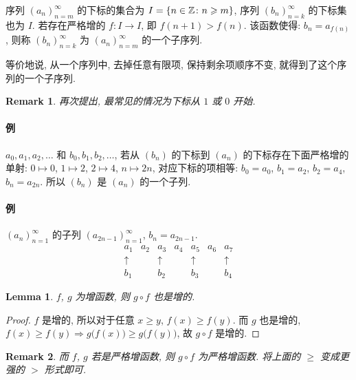 \documentclass[UTF8]{ctexart}
\theoremstyle{mystyle}
\newtheorem{lemma}{Lemma}[section]
\theoremstyle{myremark}
\newtheorem*{remark}{Remark}
\theoremstyle{plain}
\newcommand{\Z}{\mathbb Z}
\DeclarePairedDelimiter\set{\{}{\}}
\begin{document}
\begin{definition}
    序列 $ (a_n)_{n = m}^\infty $ 的下标的集合为 $ I = \set{n \in \Z \colon n \geqslant m} $, 序列 $ (b_n)_{n = k}^\infty $ 的下标集也为 $ I $. 若存在严格增的 $ f\colon I \to I $, 即 $ f(n + 1) > f(n) $. 该函数使得: $ b_n = a_{f(n)} $, 则称 $ (b_n)_{n = k}^\infty $ 为 $ (a_n)_{n = m}^\infty $ 的一个子序列.
\end{definition}

等价地说, 从一个序列中, 去掉任意有限项, 保持剩余项顺序不变, 就得到了这个序列的一个子序列.

\begin{remark}
    再次提出, 最常见的情况为下标从 $ 1 $ 或 $ 0 $ 开始.
\end{remark}

\paragraph{例}
$ a_0, a_1, a_2, \dots $ 和 $ b_0, b_1, b_2, \dots $, 若从 $ (b_n) $ 的下标到 $ (a_n) $ 的下标存在下面严格增的单射: $ 0 \mapsto 0 $, $ 1 \mapsto 2 $, $ 2 \mapsto 4 $, $ n \mapsto 2n $, 对应下标的项相等: $ b_0 = a_0 $, $ b_1 = a_2 $, $ b_2 = a_4 $, $ b_n = a_{2n} $. 所以 $ (b_n) $ 是 $ (a_n) $ 的一个子列.

\paragraph{例}
$ (a_n)_{n = 1}^\infty $ 的子列 $ (a_{2n - 1})_{n = 1}^\infty $, $ b_n = a_{2 n - 1} $.
\[ 
    \begin{array}{ccccccc}
        a_1 & a_2 & a_3 & a_4 & a_5 & a_6 & a_7 \\
        \uparrow & & \uparrow & & \uparrow & & \uparrow \\
        b_1 & & b_2 & & b_3 & & b_4
    \end{array}    
\]


\begin{lemma}
    $ f $, $ g $ 为增函数, 则 $ g \circ f $ 也是增的.
\end{lemma}

\begin{proof}
    $ f $ 是增的, 所以对于任意 $ x \geqslant y $, $ f(x) \geqslant f(y) $. 而 $ g $ 也是增的, $ f(x) \geqslant f(y) \Longrightarrow g \big( f(x) \big) \geqslant g \big( f(y) \big) $, 故 $ g \circ f $ 是增的.
\end{proof}

\begin{remark}
    而 $ f $, $ g $ 若是严格增函数, 则 $ g \circ f $ 为严格增函数. 将上面的 $ \geqslant $ 变成更强的 $ > $ 形式即可.
\end{remark}
\end{document}
